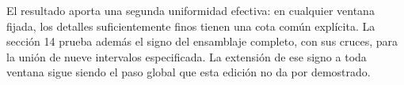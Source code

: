 El resultado aporta una segunda uniformidad efectiva: en cualquier ventana fijada, los detalles suficientemente finos tienen una cota común explícita. La sección 14 prueba además el signo del ensamblaje completo, con sus cruces, para la unión de nueve intervalos especificada. La extensión de ese signo a toda ventana sigue siendo el paso global que esta edición no da por demostrado.

